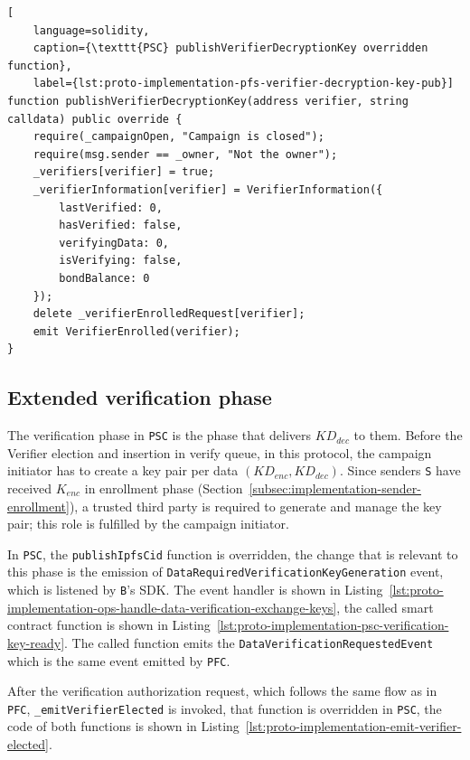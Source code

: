 \begin{lstlisting}[
    language=solidity,
    caption={\texttt{PSC} publishVerifierDecryptionKey overridden function},
    label={lst:proto-implementation-pfs-verifier-decryption-key-pub}]
function publishVerifierDecryptionKey(address verifier, string calldata) public override {
    require(_campaignOpen, "Campaign is closed");
    require(msg.sender == _owner, "Not the owner");
    _verifiers[verifier] = true;
    _verifierInformation[verifier] = VerifierInformation({
        lastVerified: 0,
        hasVerified: false,
        verifyingData: 0,
        isVerifying: false,
        bondBalance: 0
    });
    delete _verifierEnrolledRequest[verifier];
    emit VerifierEnrolled(verifier);
}
\end{lstlisting}

\subsection{Extended verification phase}\label{subsec:extended-protocol-extended-verification-phase}
The verification phase in \texttt{PSC} is the phase that delivers $KD_{dec}$ to them.
Before the Verifier election and insertion in verify queue, in this protocol, the campaign initiator has to create a key pair per data $(KD_{enc},KD_{dec})$.
Since senders \texttt{S} have received $K_{enc}$ in enrollment phase (Section~\ref{subsec:implementation-sender-enrollment}), a trusted third party is required to generate and manage the key pair; this role is fulfilled by the campaign initiator.

In \texttt{PSC}, the \texttt{publishIpfsCid} function is overridden, the change that is relevant to this phase is the emission of \texttt{DataRequiredVerificationKeyGeneration} event, which is listened by \texttt{B}'s SDK.
The event handler is shown in Listing~\ref{lst:proto-implementation-ops-handle-data-verification-exchange-keys}, the called smart contract function is shown in Listing~\ref{lst:proto-implementation-psc-verification-key-ready}.
The called function emits the \texttt{DataVerificationRequestedEvent} which is the same event emitted by \texttt{PFC}.

After the verification authorization request, which follows the same flow as in \texttt{PFC}, \texttt{\_emitVerifierElected} is invoked, that function is overridden in \texttt{PSC}, the code of both functions is shown in Listing~\ref{lst:proto-implementation-emit-verifier-elected}.



